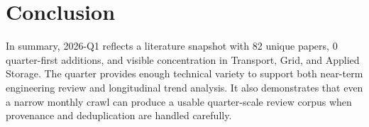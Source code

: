 \documentclass[conference]{IEEEtran}
\begin{document}
\section{Conclusion}
In summary, 2026-Q1 reflects a literature snapshot with 82 unique papers, 0 quarter-first additions, and visible concentration in Transport, Grid, and Applied Storage. The quarter provides enough technical variety to support both near-term engineering review and longitudinal trend analysis. It also demonstrates that even a narrow monthly crawl can produce a usable quarter-scale review corpus when provenance and deduplication are handled carefully.



\end{document}
